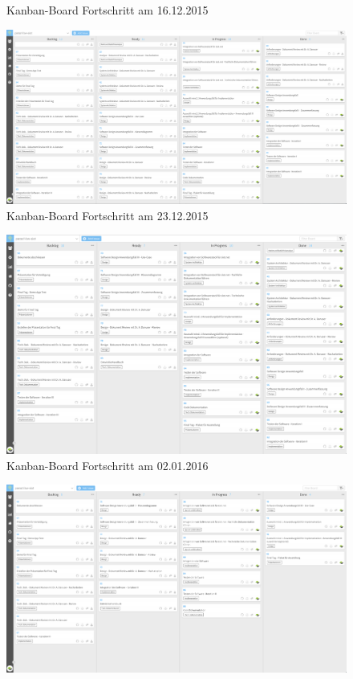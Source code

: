 \begin{landscape}
\begin{figure}[H]
  \caption[Kanban-Board 16.12.2015]{Kanban-Board Fortschritt am 16.12.2015}
\end{figure}
\begin{figure}[H]
  \centering
  \includegraphics[scale=0.34]{98_Bilder/98_Anhang/20151223_Kanban_board}
  \caption[Kanban-Board 23.12.2015]{Kanban-Board Fortschritt am 23.12.2015}
\end{figure}
\begin{figure}[H]
  \centering
  \includegraphics[scale=0.37]{98_Bilder/98_Anhang/20160102_Kanban_board}
  \caption[Kanban-Board 02.01.2016]{Kanban-Board Fortschritt am 02.01.2016}
\end{figure}
\begin{figure}[H]
  \centering
  \includegraphics[scale=0.35]{98_Bilder/98_Anhang/20160105_Kanban_board}

\end{figure}
\end{landscape}
